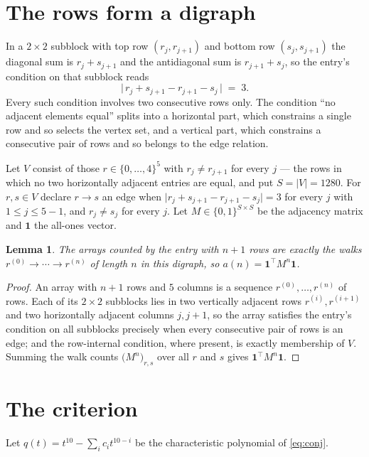\documentclass[11pt,a4paper]{article}
\theoremstyle{plain}
\newtheorem{lemma}[theorem]{Lemma}
\theoremstyle{definition}
\begin{document}
\section{The rows form a digraph}

In a $2\times2$ subblock with top row $(r_j,r_{j+1})$ and bottom row $(s_j,s_{j+1})$ the
diagonal sum is $r_j+s_{j+1}$ and the antidiagonal sum is $r_{j+1}+s_j$, so the entry's
condition on that subblock reads
\[
\bigl|\,r_j+s_{j+1}-r_{j+1}-s_j\,\bigr|\;=\;3.
\]
Every such condition involves two consecutive rows only. The condition ``no adjacent elements equal'' splits into a horizontal
part, which constrains a single row and so selects the vertex set, and a vertical part,
which constrains a consecutive pair of rows and so belongs to the edge relation.

Let $V$ consist of those $r\in\{0,\dots,4\}^{5}$ with $r_j\ne r_{j+1}$ for every
$j$ --- the rows in which no two horizontally adjacent entries are equal, and put $S=|V|=1280$. For $r,s\in V$ declare $r\to s$ an edge
when $\bigl|r_j+s_{j+1}-r_{j+1}-s_j\bigr|=3$ for every $j$ with
$1\le j\le5-1$, and $r_j\ne s_j$ for every $j$. Let $M\in\{0,1\}^{S\times S}$ be the adjacency matrix and $\mathbf{1}$
the all-ones vector.

\begin{lemma}\label{lem:walk}
The arrays counted by the entry with $n+1$ rows are exactly the walks
$r^{(0)}\to\cdots\to r^{(n)}$ of length $n$ in this digraph, so
$a(n)=\mathbf{1}^{\!\top}M^{n}\mathbf{1}$.
\end{lemma}

\begin{proof}
An array with $n+1$ rows and $5$ columns is a sequence $r^{(0)},\dots,r^{(n)}$ of
rows. Each of its $2\times2$ subblocks lies in two vertically adjacent rows
$r^{(i)},r^{(i+1)}$ and two horizontally adjacent columns $j,j+1$, so the array satisfies
the entry's condition on all subblocks precisely when every consecutive pair of rows is an
edge; and the row-internal condition, where present, is exactly membership of $V$. Summing
the walk counts $\bigl(M^{n}\bigr)_{r,s}$ over all $r$ and $s$ gives
$\mathbf{1}^{\!\top}M^{n}\mathbf{1}$.
\end{proof}

\section{The criterion}

Let $q(t)=t^{10}-\sum_i c_i t^{10-i}$ be the characteristic polynomial of
\eqref{eq:conj}.
\end{document}
